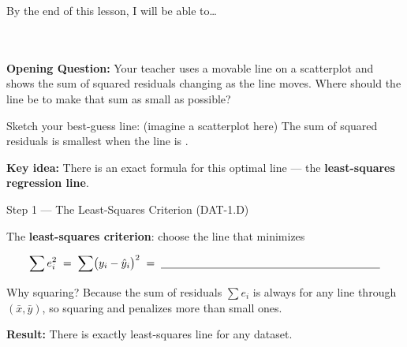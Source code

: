 \documentclass[10pt]{article}
\begin{document}
\namedateperiod

\vspace{0.12in}

\begin{objectivebox}
\small By the end of this lesson, I will be able to\dots\\[4pt]
\writeline\\[1pt]
\writeline\\[1pt]
\writeline
\end{objectivebox}

\vspace{0.1in}

\begin{vocabbox}
\end{vocabbox}

\vspace{0.1in}

\begin{hookbox}
\small\textbf{Opening Question:} Your teacher uses a movable line on a scatterplot and shows
the sum of squared residuals changing as the line moves. Where should the line be to make that
sum as small as possible?

\vspace{6pt}
Sketch your best-guess line: (imagine a scatterplot here) \quad The sum of squared residuals
is smallest when the line is \blank{6cm}.

\vspace{4pt}
\textbf{Key idea:} There is an exact formula for this optimal line --- the
\textbf{least-squares regression line}.
\end{hookbox}

\vspace{0.1in}

\begin{notesbox}{Step 1 --- The Least-Squares Criterion (DAT-1.D)}
\small

\noindent The \textbf{least-squares criterion}: choose the line that minimizes

\[
  \sum e_i^2 \;=\; \sum \bigl(y_i - \hat{y}_i\bigr)^2
  \;=\; \blank{7cm}
\]

\vspace{4pt}
Why squaring? Because the sum of residuals $\sum e_i$ is always \blank{1.5cm} for any line
through $(\bar{x}, \bar{y})$, so squaring \blank{5.5cm} and penalizes
\blank{4cm} more than small ones.

\vspace{8pt}
\textbf{Result:} There is exactly \blank{2.5cm} least-squares line for any dataset.

\end{notesbox}
\end{document}
